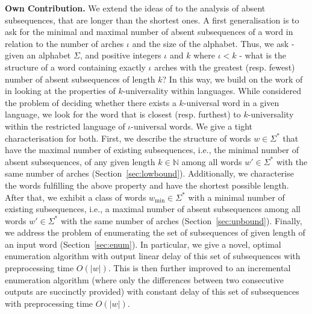 \documentclass[runningheads,UKenglish,cleveref, autoref, thm-restate]{llncs}
\newcommand{\N}{\mathbb{N}}
\begin{document}
\noindent
\textbf{Own Contribution.}
We extend the ideas of \cite{DBLP:journals/tcs/FleischmannHHHMN23,DBLP:conf/fct/FleischmannHHN23,DBLP:journals/fuin/KoscheKMS22} to the analysis of absent subsequences, that are longer than the shortest ones. A first generalisation is to ask for the minimal and maximal number of absent subsequences of a word in relation to the number of arches $\iota$ and the size of the alphabet. Thus, we ask - given an alphabet  $\Sigma$, and positive integers $\iota$ and $k$ where $\iota < k$ - what is the structure of a word containing exactly $\iota$ arches with the greatest (resp. fewest) number of absent subsequences of length $k$? In this way, we build on the work of \cite{DBLP:conf/isaac/AdamsonFHKMN23} in looking at the properties of $k$-universality within languages. While \cite{DBLP:conf/isaac/AdamsonFHKMN23} considered the problem of deciding whether there exists a $k$-universal word in a given language, we look for the word that is closest (resp. furthest) to $k$-universality within the restricted language of $\iota$-universal words.
We give a tight characterisation for both. First, we describe the structure of words $w\in\Sigma^*$ that have the maximal number of existing subsequences, i.e., the minimal number of absent subsequences, of any given length $k\in\N$ among all words $w'\in\Sigma^*$ with the same number of arches (Section~\ref{sec:lowbound}). Additionally, we characterise the words fulfilling the above property and have the shortest possible length. After that, we exhibit a class of words $w_{\min}\in\Sigma^*$ with a minimal number of existing subsequences, i.e., a maximal number of absent subsequences among all words $w'\in\Sigma^*$ with the same number of arches (Section~\ref{sec:upbound}). Finally, we address the problem of enumerating the set of subsequences of given length of an input word (Section~\ref{sec:enum}). In particular, we give a novel, optimal enumeration algorithm with output linear delay of this set of subsequences with preprocessing time $O(|w|)$. This is then further improved to an incremental enumeration algorithm (where only the differences between two consecutive outputs are succinctly provided) with constant delay of this set of subsequences with preprocessing time $O(\vert w \vert)$.
%
%
%
\end{document}
